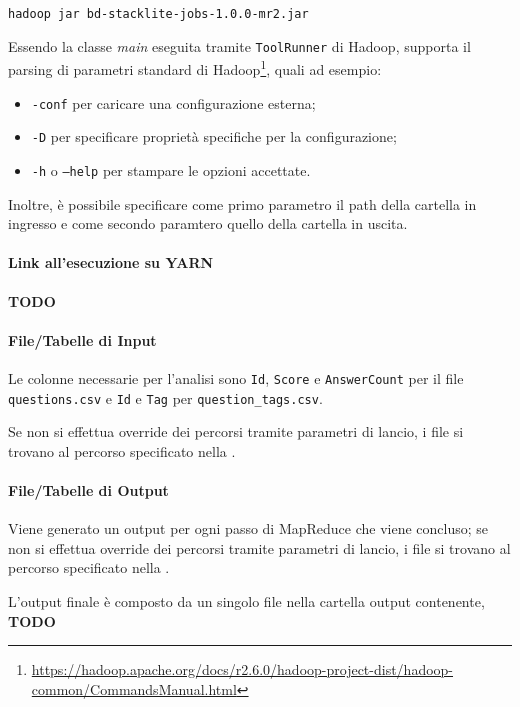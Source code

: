   \texttt{hadoop jar bd-stacklite-jobs-1.0.0-mr2.jar}

  Essendo la classe \textit{main} eseguita tramite \texttt{ToolRunner} di Hadoop,
  supporta il parsing di parametri standard di Hadoop\footnote{\url{https://hadoop.apache.org/docs/r2.6.0/hadoop-project-dist/hadoop-common/CommandsManual.html}}, quali ad esempio:
  \begin{itemize}
    \item \texttt{-conf} per caricare una configurazione esterna;
    \item \texttt{-D} per specificare proprietà specifiche per la configurazione;
    \item \texttt{-h} o \texttt{--help} per stampare le opzioni accettate.
  \end{itemize}

  Inoltre, è possibile specificare come primo parametro il path della cartella in ingresso e come secondo paramtero quello della cartella in uscita.

  \paragraph{Link all'esecuzione su YARN}\label{par:job2:mapreduce:yarn}

  \textbf{TODO}

  \paragraph{File/Tabelle di Input}\label{par:job2:mapreduce:input}

  Le colonne necessarie per l'analisi sono \texttt{Id}, \texttt{Score} e \texttt{AnswerCount} per il file \texttt{questions.csv}
  e \texttt{Id} e \texttt{Tag} per \texttt{question\_tags.csv}.

  Se non si effettua override dei percorsi tramite parametri di lancio, i file si trovano al percorso specificato nella .

  \paragraph{File/Tabelle di Output}\label{par:job2:mapreduce:output}

  Viene generato un output per ogni passo di MapReduce che viene concluso;
  se non si effettua override dei percorsi tramite parametri di lancio, i file si trovano al percorso specificato nella .

  L'output finale è composto da un singolo file nella cartella output contenente, \textbf{TODO}

